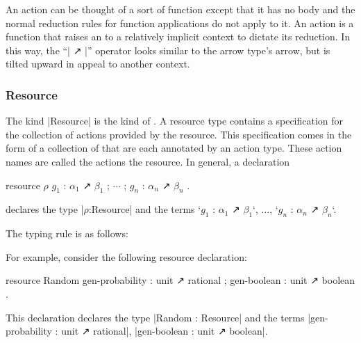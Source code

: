 An action can be thought of a sort of function except that it has no body and the normal \LangA reduction rules for function applications do not apply to it.
An action is a function that raises an  to a relatively implicit context to dictate its reduction.
In this way, the ``\code| ↗ |'' operator looks similar to the arrow type's arrow, but is tilted upward in appeal to another context.

\subsubsection{Resource}

The kind \code|Resource| is the kind of .
A resource type contains a specification for the collection of actions provided by the resource.
This specification comes in the form of a collection of  that are each annotated by an action type.
These action names are called the actions  the resource.
In general, a declaration
\begin{snippet}
resource $ρ$ { $g_1$ : $α_1$ ↗ $β_1$ ; $\cdots$ ; $g_n$ : $α_n$ ↗ $β_n$ }.
\end{snippet}
declares the type \code|$ρ$:Resource| and
the terms \code`$g_1$ : $α_1$ ↗ $β_1$`, $\dots$, \code`$g_n$ : $α_n$ ↗ $β_n$`.

\newpage
The typing rule is as follows:


\newparagraph
For example, consider the following resource declaration:
\begin{snippet}
resource Random
  { gen-probability : unit ↗ rational
  ; gen-boolean  : unit ↗ boolean }.
\end{snippet}
This declaration declares
the type \code|Random : Resource| and
the terms \code|gen-probability : unit ↗ rational|, \code|gen-boolean : unit ↗ boolean|.

%

